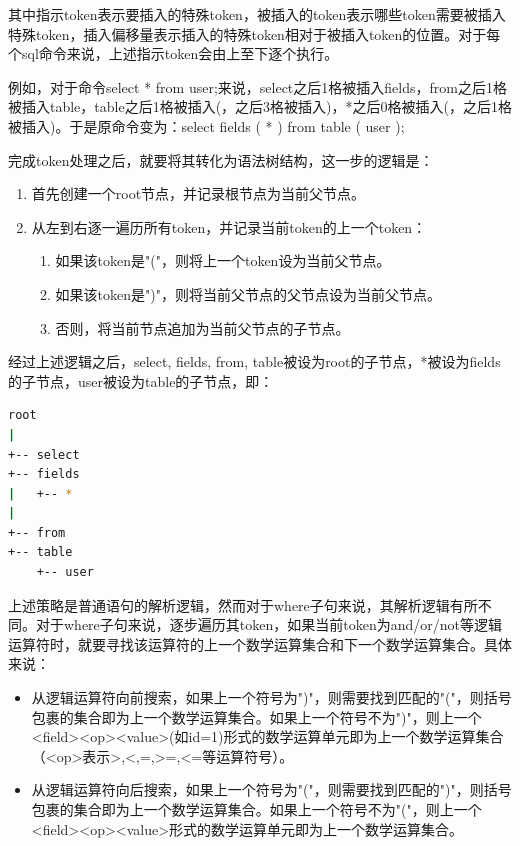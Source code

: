 其中指示token表示要插入的特殊token，被插入的token表示哪些token需要被插入特殊token，插入偏移量表示插入的特殊token相对于被插入token的位置。对于每个sql命令来说，上述指示token会由上至下逐个执行。

例如，对于命令select * from user;来说，select之后1格被插入fields，from之后1格被插入table，table之后1格被插入(，之后3格被插入)，*之后0格被插入(，之后1格被插入)。于是原命令变为：select fields ( * ) from table ( user );

完成token处理之后，就要将其转化为语法树结构，这一步的逻辑是：
\begin{enumerate}
    \item 首先创建一个root节点，并记录根节点为当前父节点。
    \item 从左到右逐一遍历所有token，并记录当前token的上一个token：
    \begin{enumerate}
        \item 如果该token是"("，则将上一个token设为当前父节点。
        \item 如果该token是")"，则将当前父节点的父节点设为当前父节点。
        \item 否则，将当前节点追加为当前父节点的子节点。
    \end{enumerate}  
\end{enumerate}

经过上述逻辑之后，select, fields, from, table被设为root的子节点，*被设为fields的子节点，user被设为table的子节点，即：

\begin{lstlisting}[language=bash]
root
|
+-- select
+-- fields 
|   +-- *
|
+-- from
+-- table
    +-- user
\end{lstlisting}

上述策略是普通语句的解析逻辑，然而对于where子句来说，其解析逻辑有所不同。对于where子句来说，逐步遍历其token，如果当前token为and/or/not等逻辑运算符时，就要寻找该运算符的上一个数学运算集合和下一个数学运算集合。具体来说：

\begin{itemize}
    \item 从逻辑运算符向前搜索，如果上一个符号为")"，则需要找到匹配的"("，则括号包裹的集合即为上一个数学运算集合。如果上一个符号不为")"，则上一个<field><op><value>(如id=1)形式的数学运算单元即为上一个数学运算集合（<op>表示>,<,=,>=,<=等运算符号）。
    \item 从逻辑运算符向后搜索，如果上一个符号为"("，则需要找到匹配的")"，则括号包裹的集合即为上一个数学运算集合。如果上一个符号不为"("，则上一个<field><op><value>形式的数学运算单元即为上一个数学运算集合。
\end{itemize}

